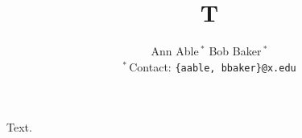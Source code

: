 \documentclass{article}
\begin{document}
\title{T}
\author{Ann Able\,$^{*}$ \quad Bob Baker\,$^{*}$ \\[2pt] {\small $^{*}$\,Contact: \texttt{\{aable, bbaker\}@x.edu}}}
\maketitle
Text.
\end{document}
